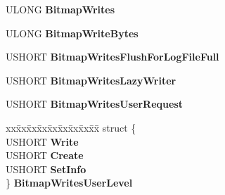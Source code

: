 \begin{DoxyCompactItemize}
U\+L\+O\+NG {\bfseries Bitmap\+Writes}
\item 
\mbox{\label{struct___n_t_f_s___s_t_a_t_i_s_t_i_c_s_aa858589249780f6b23886d483233ded3}} 
U\+L\+O\+NG {\bfseries Bitmap\+Write\+Bytes}
\item 
\mbox{\label{struct___n_t_f_s___s_t_a_t_i_s_t_i_c_s_a97eaf923c6e2e7d785fc3c3883bad831}} 
U\+S\+H\+O\+RT {\bfseries Bitmap\+Writes\+Flush\+For\+Log\+File\+Full}
\item 
\mbox{\label{struct___n_t_f_s___s_t_a_t_i_s_t_i_c_s_ae6af125bb9d6b7ebf975ccd98b969893}} 
U\+S\+H\+O\+RT {\bfseries Bitmap\+Writes\+Lazy\+Writer}
\item 
\mbox{\label{struct___n_t_f_s___s_t_a_t_i_s_t_i_c_s_a7bb9efa1a35629601ed728748c8e3aa6}} 
U\+S\+H\+O\+RT {\bfseries Bitmap\+Writes\+User\+Request}
\item 
\mbox{\label{struct___n_t_f_s___s_t_a_t_i_s_t_i_c_s_a0e8525c582b2065e1a8e0d03aa7365f8}} 
\begin{tabbing}
xx\=xx\=xx\=xx\=xx\=xx\=xx\=xx\=xx\=\kill
struct \{\\
\>USHORT {\bfseries Write}\\
\>USHORT {\bfseries Create}\\
\>USHORT {\bfseries SetInfo}\\
\} {\bfseries BitmapWritesUserLevel}\\


\end{tabbing}
\end{DoxyCompactItemize}

